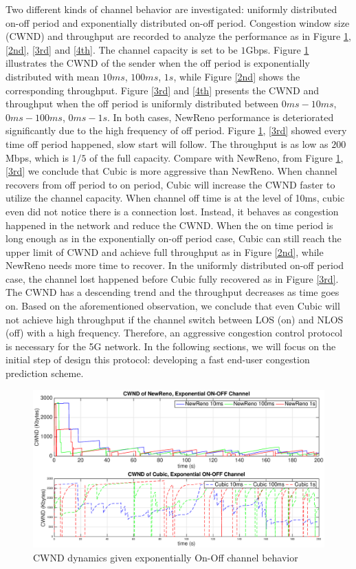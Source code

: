 Two different kinds of channel behavior are investigated: uniformly distributed on-off period and exponentially distributed on-off period. Congestion window size (CWND) and throughput are recorded to analyze the performance as in Figure \ref{1st}, \ref{2nd}, \ref{3rd} and \ref{4th}.  The channel capacity is set to be $1$Gbps. Figure \ref{1st} illustrates the CWND of the sender when the off period is exponentially distributed with mean $10ms$, $100ms$, $1s$, while Figure \ref{2nd} shows the corresponding throughput. Figure \ref{3rd} and \ref{4th} presents the CWND and throughput when the off period is uniformly distributed between $0ms - 10ms$, $0ms - 100ms$, $0ms - 1s$. In both cases, NewReno performance is deteriorated significantly due to the high frequency of off period. Figure \ref{1st}, \ref{3rd} showed every time off period happened, slow start will follow. The throughput is as low as $200$Mbps, which is $1/5$ of the full capacity. Compare with NewReno, from Figure \ref{1st}, \ref{3rd} we conclude that Cubic is more aggressive than NewReno. When channel recovers from off period to on period, Cubic will increase the CWND faster to utilize the channel capacity.  When channel off time is at the level of 10ms, cubic even did not notice there is a connection lost. Instead, it behaves as congestion happened in the network and reduce the CWND. When the on time period is long enough as in the exponentially on-off period case, Cubic can still reach the upper limit of CWND and achieve full throughput as in Figure \ref{2nd}, while NewReno needs more time to recover. In the uniformly distributed on-off period case, the channel lost happened before Cubic fully recovered as in Figure \ref{3rd}. The CWND has a descending trend and the throughput decreases as time goes on. Based on the aforementioned observation, we conclude that even Cubic will not achieve high throughput if the channel switch between LOS (on) and NLOS (off) with a high frequency. Therefore, an aggressive congestion control protocol is necessary for the 5G network. In the following sections, we will focus on the initial step of design this protocol: developing a fast end-user congestion prediction scheme.
\begin{figure}
\centering
\includegraphics[width=14cm]{1.eps}
\caption{CWND dynamics given exponentially On-Off channel behavior}
\label{1st}
\end{figure}
